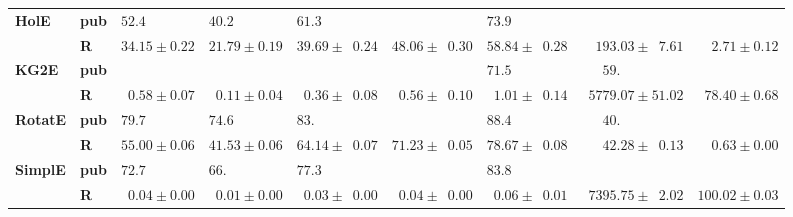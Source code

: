 \begin{tabular}{llrrrrrrr}
\textbf{HolE} & \textbf{pub} &  $52.4\phantom{0 \pm 0.00}$ &  $40.2\phantom{0 \pm 0.00}$ &            $61.3\phantom{0 \pm 00.00}$ &                                        &            $73.9\phantom{0 \pm 00.00}$ &                                           &                              \\
       & \textbf{R} &            $34.15 \pm 0.22$ &            $21.79 \pm 0.19$ &            $39.69 \pm \phantom{0}0.24$ &            $48.06 \pm \phantom{0}0.30$ &            $58.84 \pm \phantom{0}0.28$ &  $\phantom{00}193.03 \pm \phantom{0}7.61$ &  $\phantom{00}2.71 \pm 0.12$ \\\midrule
\textbf{KG2E} & \textbf{pub} &                             &                             &                                        &                                        &            $71.5\phantom{0 \pm 00.00}$ &  $\phantom{000}59.\phantom{00 \pm 00.00}$ &                              \\
       & \textbf{R} &  $\phantom{0}0.58 \pm 0.07$ &  $\phantom{0}0.11 \pm 0.04$ &  $\phantom{0}0.36 \pm \phantom{0}0.08$ &  $\phantom{0}0.56 \pm \phantom{0}0.10$ &  $\phantom{0}1.01 \pm \phantom{0}0.14$ &            $\phantom{0}5779.07 \pm 51.02$ &  $\phantom{0}78.40 \pm 0.68$ \\\midrule
\textbf{RotatE} & \textbf{pub} &  $79.7\phantom{0 \pm 0.00}$ &  $74.6\phantom{0 \pm 0.00}$ &            $83.\phantom{00 \pm 00.00}$ &                                        &            $88.4\phantom{0 \pm 00.00}$ &  $\phantom{000}40.\phantom{00 \pm 00.00}$ &                              \\
       & \textbf{R} &            $55.00 \pm 0.06$ &            $41.53 \pm 0.06$ &            $64.14 \pm \phantom{0}0.07$ &            $71.23 \pm \phantom{0}0.05$ &            $78.67 \pm \phantom{0}0.08$ &  $\phantom{000}42.28 \pm \phantom{0}0.13$ &  $\phantom{00}0.63 \pm 0.00$ \\\midrule
\textbf{SimplE} & \textbf{pub} &  $72.7\phantom{0 \pm 0.00}$ &  $66.\phantom{00 \pm 0.00}$ &            $77.3\phantom{0 \pm 00.00}$ &                                        &            $83.8\phantom{0 \pm 00.00}$ &                                           &                              \\
       & \textbf{R} &  $\phantom{0}0.04 \pm 0.00$ &  $\phantom{0}0.01 \pm 0.00$ &  $\phantom{0}0.03 \pm \phantom{0}0.00$ &  $\phantom{0}0.04 \pm \phantom{0}0.00$ &  $\phantom{0}0.06 \pm \phantom{0}0.01$ &  $\phantom{0}7395.75 \pm \phantom{0}2.02$ &            $100.02 \pm 0.03$ \\

\end{tabular}

